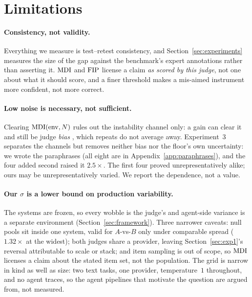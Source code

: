 \section{Limitations}
\label{sec:limitations}

\paragraph{Consistency, not validity.}
Everything we measure is test--retest consistency, and
Section~\ref{sec:experiments} measures the size of the gap against the
benchmark's expert annotations rather than asserting it. $\mathrm{MDI}$ and $\mathrm{FIP}$
license a claim \emph{as scored by this judge}, not one about what it should
score, and a finer threshold makes a mis-aimed instrument more confident,
not more correct.

\paragraph{Low noise is necessary, not sufficient.}
Clearing $\mathrm{MDI}(\mathrm{env}, N)$ rules out the instability channel only: a gain can
clear it and still be judge \emph{bias} \citep{zhou2026selfplay}, which repeats
do not average away. Experiment~3 separates the channels but removes neither
bias nor the floor's own uncertainty: we wrote the paraphrases (all eight are
in Appendix~\ref{app:paraphrases}), and the four added second raised it
$2.5\times$. The first four proved
unrepresentatively alike; ours may be unrepresentatively varied. We report the
dependence, not a value.

\paragraph{Our $\sigma$ is a lower bound on production variability.}
The systems are frozen, so every wobble is the judge's and agent-side variance
is a separate environment (Section~\ref{sec:framework}). Three narrower
caveats: null pools sit inside one system, valid for $A$-vs-$B$ only under
comparable spread ($1.32\times$ at the widest); both judges share a provider,
leaving Section~\ref{sec:exp1}'s reversal attributable to scale or stack; and
item sampling is out of scope, so $\mathrm{MDI}$ licenses a claim about the stated
item set, not the population.
The grid is narrow in kind as well as size: two text tasks, one provider,
temperature~$1$ throughout, and no agent traces, so the agent pipelines that
motivate the question are argued from, not measured.

